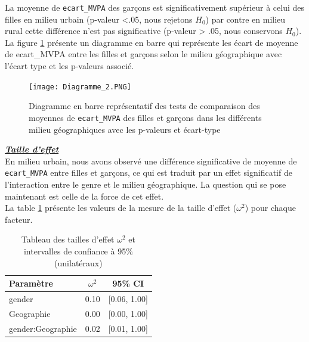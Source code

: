 \documentclass[12pt,a4paper]{article}
\begin{document}
\begin{enumerate}[label=\textbf{\alph*})]
\begin{table}[H]
		\label{tab:ecarts_mvpa_genre_localisation}
	\end{table}
	
	La moyenne de \texttt{ecart\_MVPA} des garçons est significativement supérieur à celui des filles en milieu urbain (p-valeur <.05, nous rejetons $H_0$) par contre en milieu rural cette différence n'est pas significative (p-valeur > .05, nous conservons $H_0$). \\
	
	La figure \ref{fig:Test post hoc_2} présente un diagramme en barre qui représente les écart de moyenne de ecart\_MVPA entre les filles et garçons selon le milieu géographique avec l'écart type et les p-valeurs associé.
	
	\begin{figure}[H]
		\centering
		\texttt{[image: Diagramme\_2.PNG]}
		\caption{Diagramme en barre représentatif des tests de comparaison des moyennes de \texttt{ecart\_MVPA} des filles et garçons dans les différents milieu géographiques avec les p-valeurs et écart-type}
		\label{fig:Test post hoc_2}
	\end{figure}
	
	\noindent
\textbf{\textit{\underline{Taille d'effet}}} \\

En milieu urbain, nous avons observé une différence significative de moyenne de \texttt{ecart\_MVPA} entre filles et garçons, ce qui est traduit par un effet significatif de l'interaction entre le genre et le milieu géographique. La question qui se pose maintenant est celle de la force de cet effet. \\
La table \ref{table:effect_size_3} présente les valeurs de la mesure de la taille d'effet ($\omega^2$) pour chaque facteur.
\begin{table}[H]
	\centering
	\caption{Tableau des tailles d'effet $\omega^2$ et intervalles de confiance à 95\% (unilatéraux)}
	\begin{tabular}{|l|c|c|}
		\hline
		\textbf{Paramètre} & \textbf{$\omega^2$} & \textbf{95\% CI} \\
		\hline
		gender             & 0.10                      & [0.06, 1.00]      \\
		Geographie         & 0.00                      & [0.00, 1.00]      \\
		gender:Geographie  & 0.02                      & [0.01, 1.00]      \\
		\hline
	\end{tabular}
	\label{table:effect_size_3}
\end{table}


\end{enumerate}
\end{document}
